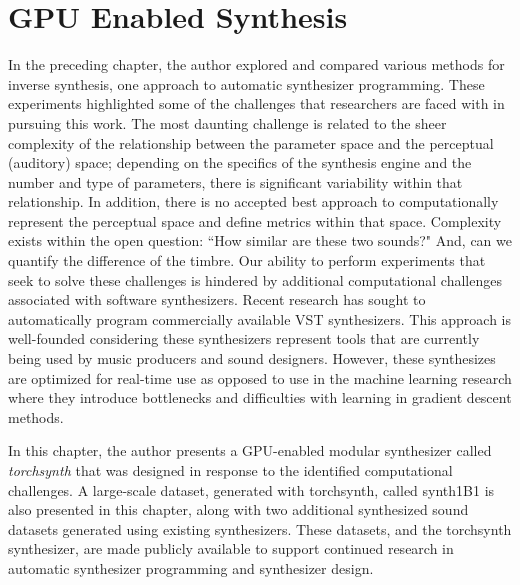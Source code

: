\graphicspath{{./}{./figures/}{./figures/torchsynth/}}

\chapter{GPU Enabled Synthesis}
\label{chapter:torchsynth}

In the preceding chapter, the author explored and compared various methods for inverse synthesis, one approach to automatic synthesizer programming. These experiments highlighted some of the challenges that researchers are faced with in pursuing this work. The most daunting challenge is related to the sheer complexity of the relationship between the parameter space and the perceptual (auditory) space; depending on the specifics of the synthesis engine and the number and type of parameters, there is significant variability within that relationship. In addition, there is no accepted best approach to computationally represent the perceptual space and define metrics within that space. Complexity exists within the open question:  ``How similar are these two sounds?" And, can we quantify the difference of the timbre. Our ability to perform experiments that seek to solve these challenges is hindered by additional computational challenges associated with software synthesizers. Recent research has sought to automatically program commercially available VST synthesizers. This approach is well-founded considering these synthesizers represent tools that are currently being used by music producers and sound designers. However, these synthesizes are optimized for real-time use as opposed to use in the machine learning research where they introduce bottlenecks \cite{masudo2021quality} and difficulties with learning in gradient descent methods.

In this chapter, the author presents a GPU-enabled modular synthesizer called \textit{torchsynth} that was designed in response to the identified computational challenges. A large-scale dataset, generated with torchsynth, called synth1B1 is also presented in this chapter, along with two additional synthesized sound datasets generated using existing synthesizers. These datasets, and the torchsynth synthesizer, are made publicly available to support continued research in automatic synthesizer programming and synthesizer design. 

